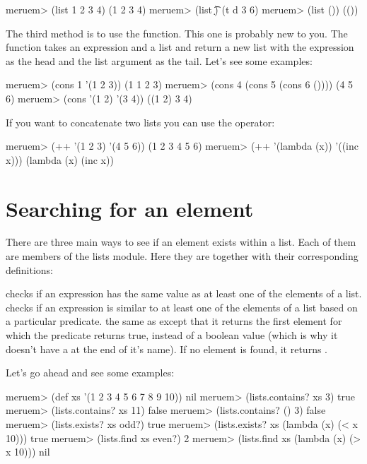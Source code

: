 \begin{REPL}
meruem> (list 1 2 3 4)
(1 2 3 4)
meruem> (list \t \d {})
(t d 3 6)
meruem> (list ())
(())
\end{REPL}

The third method is to use the  function. This one is probably new to you. The  function takes an expression and a list and return a new list with the expression as the head and the list argument as the tail. Let's see some examples:

\begin{REPL}
meruem> (cons 1 '(1 2 3))
(1 1 2 3)
meruem> (cons 4 (cons 5 (cons 6 ())))
(4 5 6)
meruem> (cons '(1 2) '(3 4))
((1 2) 3 4)
\end{REPL}

If you want to concatenate two lists you can use the \code{++} operator:

\begin{REPL}
meruem> (++ '(1 2 3) '(4 5 6))
(1 2 3 4 5 6)
meruem> (++ '(lambda (x)) '((inc x)))
(lambda (x) (inc x))
\end{REPL}

\section{Searching for an element}
There are three main ways to see if an element exists within a list. Each of them are members of the lists module. Here they are together with their corresponding definitions:

\begin{description}
	 checks if an expression has the same value as at least one of the elements of a list.
	 checks if an expression is similar to at least one of the elements of a list based on a particular predicate.
	 the same as  except that it returns the first element for which the predicate returns true, instead of a boolean value (which is why it doesn't have a  at the end of it's name). If no element is found, it returns .
\end{description}

Let's go ahead and see some examples:

\begin{REPL}
meruem> (def xs '(1 2 3 4 5 6 7 8 9 10))
nil
meruem> (lists.contains? xs 3)
true
meruem> (lists.contains? xs 11)
false
meruem> (lists.contains? () 3)
false
meruem> (lists.exists? xs odd?)
true
meruem> (lists.exists? xs (lambda (x) (< x 10)))
true
meruem> (lists.find xs even?)
2
meruem> (lists.find xs (lambda (x) (> x 10)))
nil
\end{REPL}

